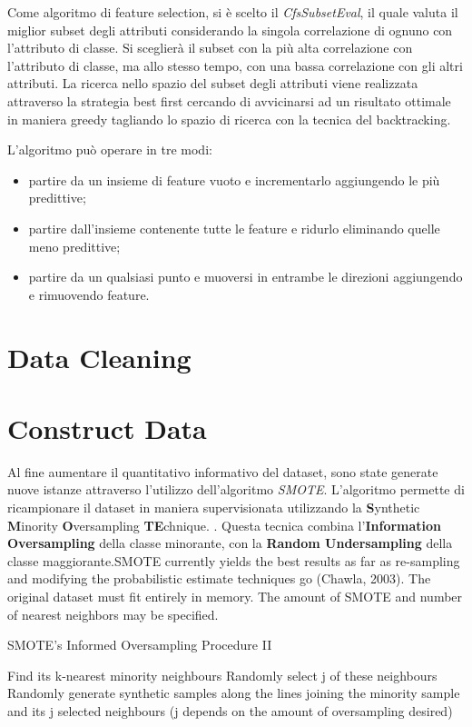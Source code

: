 Come algoritmo di feature selection, si è scelto il \textit{CfsSubsetEval}, il quale valuta il miglior subset degli attributi considerando la singola correlazione di ognuno con l'attributo di classe. Si sceglierà il subset con la più alta correlazione con l'attributo di classe, ma allo stesso tempo, con una bassa correlazione con gli altri attributi. La ricerca nello spazio del subset degli attributi viene realizzata attraverso la strategia best first cercando di avvicinarsi ad un risultato ottimale in maniera greedy tagliando lo spazio di ricerca con la tecnica del backtracking.\cite{Hall1998}

L'algoritmo può operare in tre modi:
\begin{itemize}
	\item partire da un insieme di feature vuoto e incrementarlo aggiungendo le più predittive;
	\item partire dall'insieme contenente tutte le feature e ridurlo eliminando quelle meno predittive;
	\item partire da un qualsiasi punto e muoversi in entrambe le direzioni aggiungendo e rimuovendo feature.
\end{itemize}

\section{Data Cleaning}

\section{Construct Data}

Al fine aumentare il quantitativo informativo del dataset, sono state generate nuove istanze attraverso l'utilizzo dell'algoritmo \textit{SMOTE}. L'algoritmo permette di ricampionare il dataset in maniera supervisionata utilizzando la \textbf{S}ynthetic \textbf{M}inority \textbf{O}versampling \textbf{TE}chnique. 
\cite{Chawla02smote:synthetic}. Questa tecnica combina l'\textbf{Information Oversampling} della classe minorante, con la \textbf{Random Undersampling} della classe maggiorante.SMOTE currently yields the best results as far as re-sampling and modifying the probabilistic estimate techniques go (Chawla, 2003).
The original dataset must fit entirely in memory. The amount of SMOTE and number of nearest neighbors may be specified.

\begin{algorithm}
	\caption{SMOTE’s Informed Oversampling Procedure II}
	\begin{algorithmic} 
		\STATE Find its k-nearest minority neighbours
		\STATE Randomly select j of these neighbours
		\STATE Randomly generate synthetic samples along the lines joining the minority sample and its j selected neighbours
		(j depends on the amount of oversampling desired) 
		\ENDFOR
	\end{algorithmic}
\end{algorithm}

